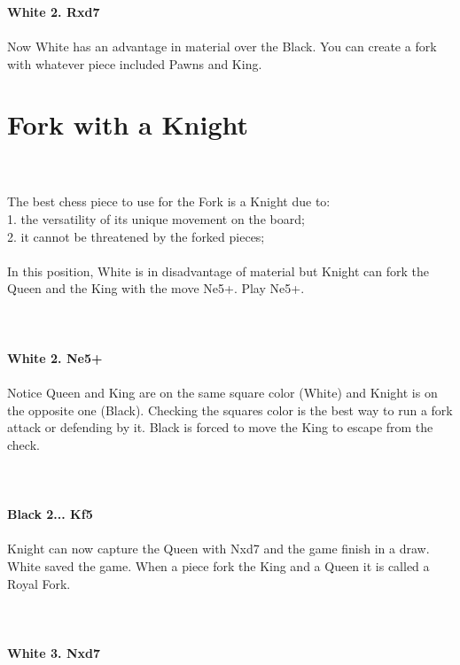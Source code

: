 \documentclass{article}
\begin{document}
\\

\\
\\
\textbf{White 2. Rxd7}\\
\\
Now White has an advantage in material over the Black. You can create a fork with whatever piece included Pawns and King.\section{ Fork with a Knight}

\\
\\
The best chess piece to use for the Fork is a Knight due to:\\1. the versatility of its unique movement on the board;\\2. it cannot be threatened by the forked pieces;\\\\In this position, White is in disadvantage of material but Knight can fork the Queen and the King with the move Ne5+. Play Ne5+.\\
\\

\\
\\
\textbf{White 2. Ne5+}\\
\\
Notice Queen and King are on the same square color (White) and Knight is on the opposite one (Black). Checking the squares color is the best way to run a fork attack or defending by it. Black is forced to move the King to escape from the check.\\
\\

\\
\\
\textbf{Black 2... Kf5}\\
\\
Knight can now capture the Queen with Nxd7 and the game finish in a draw. White saved the game. When a piece fork the King and a Queen it is called a Royal Fork.\\
\\

\\
\\
\textbf{White 3. Nxd7}\\
\end{document}
